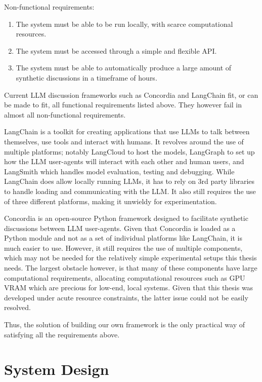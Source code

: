 Non-functional requirements:
\begin{enumerate}
	\item The system must be able to be run locally, with scarce computational resources.
	\item The system must be accessed through a simple and flexible \ac{API}.
	\item The system must be able to automatically produce a large amount of synthetic discussions in a timeframe of hours.
\end{enumerate}

Current LLM discussion frameworks such as Concordia \cite{Vezhnevets2023GenerativeAM} and LangChain \cite{langchain} fit, or can be made to fit, all functional requirements listed above. They however fail in almost all non-functional requirements. 

LangChain is a toolkit for creating applications that use LLMs to talk between themselves, use tools and interact with humans. It revolves around the use of multiple platforms; notably LangCloud to host the models, LangGraph to set up how the LLM user-agents will interact with each other and human users, and LangSmith which handles model evaluation, testing and debugging. While LangChain does allow locally running LLMs, it has to rely on 3rd party libraries to handle loading and communicating with the LLM. It also still requires the use of three different platforms, making it unwieldy for experimentation.

Concordia is an open-source Python framework designed to facilitate synthetic discussions between LLM user-agents. Given that Concordia is loaded as a Python module and not as a set of individual platforms like LangChain, it is much easier to use. However, it still requires the use of multiple components, which may not be needed for the relatively simple experimental setups this thesis needs. The largest obstacle however, is that many of these components have large computational requirements, allocating computational resources such as GPU VRAM which are precious for low-end, local systems. Given that this thesis was developed under acute resource constraints, the latter issue could not be easily resolved.

Thus, the solution of building our own framework is the only practical way of satisfying all the requirements above.



\section{System Design}
\label{sec:system:design-system}

